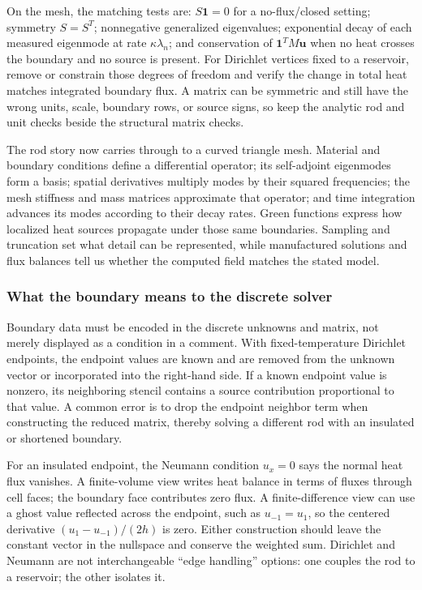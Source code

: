 On the mesh, the matching tests are: \(S\mathbf1=0\) for a no-flux/closed setting; symmetry \(S=S^T\); nonnegative generalized eigenvalues; exponential decay of each measured eigenmode at rate \(\kappa\lambda_n\); and conservation of \(\mathbf1^TM\mathbf u\) when no heat crosses the boundary and no source is present. For Dirichlet vertices fixed to a reservoir, remove or constrain those degrees of freedom and verify the change in total heat matches integrated boundary flux. A matrix can be symmetric and still have the wrong units, scale, boundary rows, or source signs, so keep the analytic rod and unit checks beside the structural matrix checks.

The rod story now carries through to a curved triangle mesh. Material and boundary conditions define a differential operator; its self-adjoint eigenmodes form a basis; spatial derivatives multiply modes by their squared frequencies; the mesh stiffness and mass matrices approximate that operator; and time integration advances its modes according to their decay rates. Green functions express how localized heat sources propagate under those same boundaries. Sampling and truncation set what detail can be represented, while manufactured solutions and flux balances tell us whether the computed field matches the stated model.

\subsubsection{What the boundary means to the discrete solver}\label{02-foundations-ii-ch025-what-the-boundary-means-to-the-discrete-solver}

\hypertarget{02-foundations-ii-ch025-what-the-boundary-means-to-the-discrete-solver}{}

Boundary data must be encoded in the discrete unknowns and matrix, not merely displayed as a condition in a comment. With fixed-temperature Dirichlet endpoints, the endpoint values are known and are removed from the unknown vector or incorporated into the right-hand side. If a known endpoint value is nonzero, its neighboring stencil contains a source contribution proportional to that value. A common error is to drop the endpoint neighbor term when constructing the reduced matrix, thereby solving a different rod with an insulated or shortened boundary.

For an insulated endpoint, the Neumann condition \(u_x=0\) says the normal heat flux vanishes. A finite-volume view writes heat balance in terms of fluxes through cell faces; the boundary face contributes zero flux. A finite-difference view can use a ghost value reflected across the endpoint, such as \(u_{-1}=u_1\), so the centered derivative \((u_1-u_{-1})/(2h)\) is zero. Either construction should leave the constant vector in the nullspace and conserve the weighted sum. Dirichlet and Neumann are not interchangeable ``edge handling'' options: one couples the rod to a reservoir; the other isolates it.

